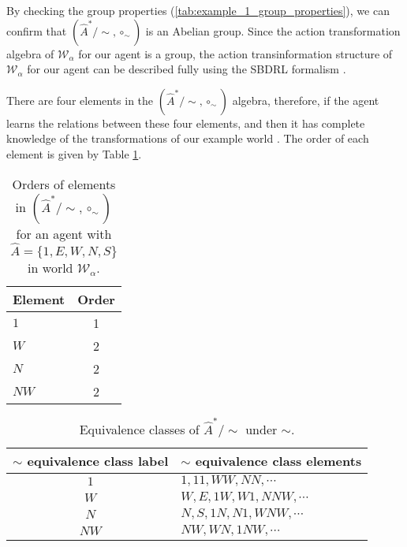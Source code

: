 By checking the group properties (\cref{tab:example_1_group_properties}), we can confirm that $(\hat{A}^{*}/\sim, \circ_{\sim})$ is an Abelian group.
Since the action transformation algebra of $\mathscr{W}_{\alpha}$ for our agent is a group, the action transinformation structure of $\mathscr{W}_{\alpha}$ for our agent can be described fully using the SBDRL formalism .


There are four elements in the $(\hat{A}^{*}/\sim, \circ_{\sim})$ algebra, therefore, if the agent learns the relations between these four elements, and then it has complete knowledge of the transformations of our example world .
The order of each element is given by Table \ref{tab:example_1_element_orders}.

\begin{table}
    \centering
    \begin{tabular}{l|c}
        \textbf{Element}   & \textbf{Order} \\
        \hline
        $1$     & 1\\
        $W$     & 2\\
        $N$     & 2\\
        $NW$    & 2
    \end{tabular}
    \caption{
    Orders of elements in $(\hat{A}^{*}/\sim, \circ_{\sim})$ for an agent with $\hat{A} = \{1, E, W, N, S \}$ in world $\mathscr{W}_{\alpha}$.
    }
    \label{tab:example_1_element_orders}
\end{table}

\begin{table}[H]
    \centering
    \begin{tabular}{c|l}
        $\sim$ equivalence class label & $\sim$ equivalence class elements\\
        \hline
        $1$         & $1, 11, WW, NN, \cdots$\\
        $W$         & $W, E, 1W, W1, NNW, \cdots$\\
        $N$         & $N, S, 1N, N1, WNW, \cdots$\\
        $NW$        & $NW, WN, 1NW, \cdots$
    \end{tabular}
    \caption{Equivalence classes of $\hat{A}^{*}/\sim$ under $\sim$.}
\end{table}

